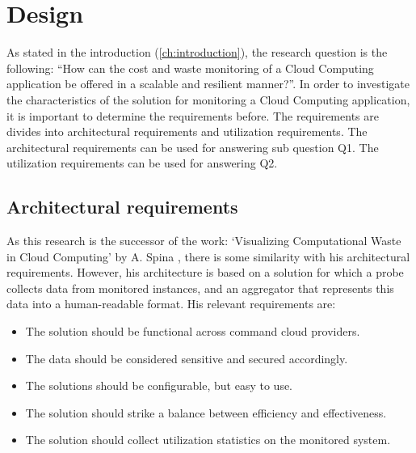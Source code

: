 \chapter{Design}\label{ch:design} %
As stated in the introduction (\autoref{ch:introduction}), the research question is the following: ``How can the cost and waste monitoring of a Cloud Computing application be offered in a scalable and resilient manner?''. In order to investigate the characteristics of the solution for monitoring a Cloud Computing application, it is important to determine the requirements before. The requirements are divides into architectural requirements and utilization requirements. The architectural requirements can be used for answering sub question Q1. The utilization requirements can be used for answering Q2. 

\section{Architectural requirements}
As this research is the successor of the work: `Visualizing Computational Waste in Cloud Computing' by A. Spina \cite{spina}, there is some similarity with his architectural requirements. However, his architecture is based on a solution for which a probe collects data from monitored instances, and an aggregator that represents this data into a human-readable format. His relevant requirements are:
\begin{itemize}
    \item The solution should be functional across command cloud providers.
    \item The data should be considered sensitive and secured accordingly.
    \item The solutions should be configurable, but easy to use.
    \item The solution should strike a balance between efficiency and effectiveness.
    \item The solution should collect utilization statistics on the monitored system. 
\end{itemize}


